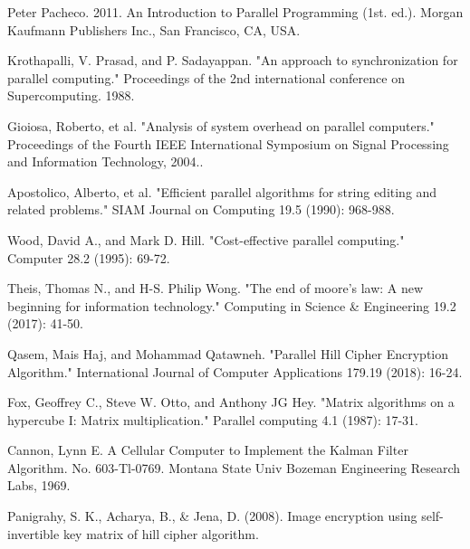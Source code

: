 \documentclass[letterpaper, 10 pt, conference]{ieeeconf}  %
\begin{document}
\begin{thebibliography}{99}

 Peter Pacheco. 2011. An Introduction to Parallel Programming (1st. ed.). Morgan Kaufmann Publishers Inc., San Francisco, CA, USA.

Krothapalli, V. Prasad, and P. Sadayappan. "An approach to synchronization for parallel computing." Proceedings of the 2nd international conference on Supercomputing. 1988.

Gioiosa, Roberto, et al. "Analysis of system overhead on parallel computers." Proceedings of the Fourth IEEE International Symposium on Signal Processing and Information Technology, 2004..

Apostolico, Alberto, et al. "Efficient parallel algorithms for string editing and related problems." SIAM Journal on Computing 19.5 (1990): 968-988.

Wood, David A., and Mark D. Hill. "Cost-effective parallel computing." Computer 28.2 (1995): 69-72.

Theis, Thomas N., and H-S. Philip Wong. "The end of moore's law: A new beginning for information technology." Computing in Science \& Engineering 19.2 (2017): 41-50.

Qasem, Mais Haj, and Mohammad Qatawneh. "Parallel Hill Cipher Encryption Algorithm." International Journal of Computer Applications 179.19 (2018): 16-24.

Fox,  Geoffrey  C.,  Steve  W.  Otto,  and  Anthony  JG  Hey. "Matrix     algorithms     on     a     hypercube     I:     Matrix multiplication." Parallel computing 4.1 (1987): 17-31.

Cannon, Lynn E. A Cellular Computer to Implement the Kalman  Filter  Algorithm.  No.  603-Tl-0769.  Montana State Univ Bozeman Engineering Research Labs, 1969.

Panigrahy, S. K., Acharya, B., \& Jena, D. (2008). Image encryption  using  self-invertible  key  matrix  of  hill  cipher algorithm.
\end{thebibliography}
\end{document}
